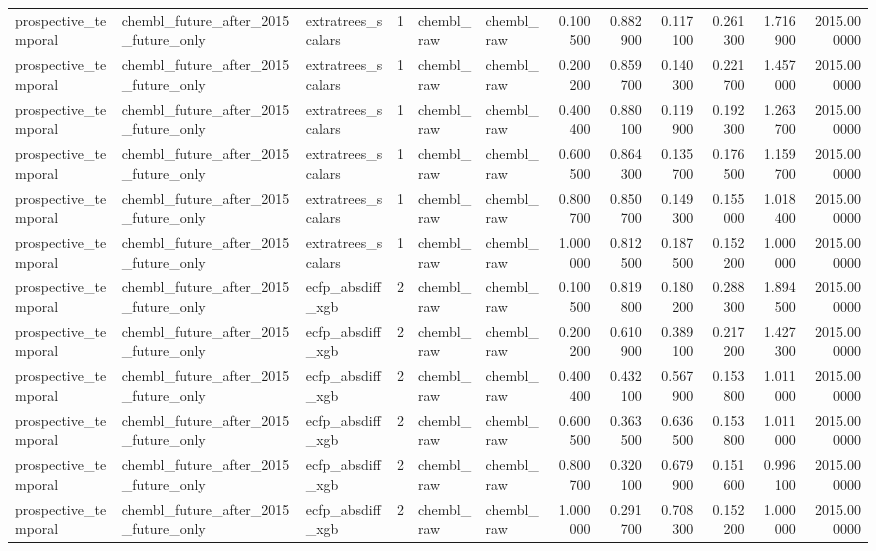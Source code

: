 \begin{longtable}{lllrllrrrrrr}
prospective\_temporal & chembl\_future\_after\_2015\_future\_only & extratrees\_scalars & 1 & chembl\_raw & chembl\_raw & 0.100500 & 0.882900 & 0.117100 & 0.261300 & 1.716900 & 2015.000000 \\
prospective\_temporal & chembl\_future\_after\_2015\_future\_only & extratrees\_scalars & 1 & chembl\_raw & chembl\_raw & 0.200200 & 0.859700 & 0.140300 & 0.221700 & 1.457000 & 2015.000000 \\
prospective\_temporal & chembl\_future\_after\_2015\_future\_only & extratrees\_scalars & 1 & chembl\_raw & chembl\_raw & 0.400400 & 0.880100 & 0.119900 & 0.192300 & 1.263700 & 2015.000000 \\
prospective\_temporal & chembl\_future\_after\_2015\_future\_only & extratrees\_scalars & 1 & chembl\_raw & chembl\_raw & 0.600500 & 0.864300 & 0.135700 & 0.176500 & 1.159700 & 2015.000000 \\
prospective\_temporal & chembl\_future\_after\_2015\_future\_only & extratrees\_scalars & 1 & chembl\_raw & chembl\_raw & 0.800700 & 0.850700 & 0.149300 & 0.155000 & 1.018400 & 2015.000000 \\
prospective\_temporal & chembl\_future\_after\_2015\_future\_only & extratrees\_scalars & 1 & chembl\_raw & chembl\_raw & 1.000000 & 0.812500 & 0.187500 & 0.152200 & 1.000000 & 2015.000000 \\
prospective\_temporal & chembl\_future\_after\_2015\_future\_only & ecfp\_absdiff\_xgb & 2 & chembl\_raw & chembl\_raw & 0.100500 & 0.819800 & 0.180200 & 0.288300 & 1.894500 & 2015.000000 \\
prospective\_temporal & chembl\_future\_after\_2015\_future\_only & ecfp\_absdiff\_xgb & 2 & chembl\_raw & chembl\_raw & 0.200200 & 0.610900 & 0.389100 & 0.217200 & 1.427300 & 2015.000000 \\
prospective\_temporal & chembl\_future\_after\_2015\_future\_only & ecfp\_absdiff\_xgb & 2 & chembl\_raw & chembl\_raw & 0.400400 & 0.432100 & 0.567900 & 0.153800 & 1.011000 & 2015.000000 \\
prospective\_temporal & chembl\_future\_after\_2015\_future\_only & ecfp\_absdiff\_xgb & 2 & chembl\_raw & chembl\_raw & 0.600500 & 0.363500 & 0.636500 & 0.153800 & 1.011000 & 2015.000000 \\
prospective\_temporal & chembl\_future\_after\_2015\_future\_only & ecfp\_absdiff\_xgb & 2 & chembl\_raw & chembl\_raw & 0.800700 & 0.320100 & 0.679900 & 0.151600 & 0.996100 & 2015.000000 \\
prospective\_temporal & chembl\_future\_after\_2015\_future\_only & ecfp\_absdiff\_xgb & 2 & chembl\_raw & chembl\_raw & 1.000000 & 0.291700 & 0.708300 & 0.152200 & 1.000000 & 2015.000000 \\

\end{longtable}
